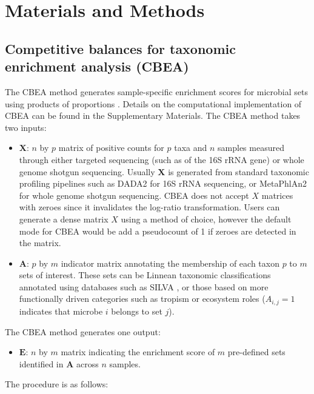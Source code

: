 \documentclass[10pt,letterpaper]{article}
\begin{document}
\section*{Materials and Methods} \label{methods}
\subsection*{Competitive balances for taxonomic enrichment analysis (CBEA)}
The CBEA method generates sample-specific enrichment scores for microbial sets using products of proportions \cite{egozcue2003}. Details on the computational implementation of CBEA can be found in the Supplementary Materials. The CBEA method takes two inputs:  
\begin{itemize}
    \item $\mathbf{X}$: $n$ by $p$ matrix of positive counts for $p$ taxa and $n$ samples measured through either targeted sequencing (such as of the 16S rRNA gene) or whole genome shotgun sequencing. Usually $\mathbf{X}$ is generated from standard taxonomic profiling pipelines such as DADA2 \cite{callahan2016} for 16S rRNA sequencing, or MetaPhlAn2 \cite{truong2015} for whole genome shotgun sequencing. CBEA does not accept $X$ matrices with zeroes since it invalidates the log-ratio transformation. Users can generate a dense matrix $X$ using a method of choice, however the default mode for CBEA would be add a pseudocount of 1 if zeroes are detected in the matrix. 
    \item $\mathbf{A}$: $p$ by $m$ indicator matrix annotating the membership of each taxon $p$ to $m$ sets of interest. These sets can be Linnean taxonomic classifications annotated using databases such as SILVA \cite{quast2013}, or those based on more functionally driven categories such as tropism or ecosystem roles ($A_{i,j} = 1$ indicates that microbe $i$ belongs to set $j$). 
\end{itemize}
The CBEA method generates one output:  
\begin{itemize} 
    \item $\mathbf{E}$: $n$ by $m$ matrix indicating the enrichment score of $m$ pre-defined sets identified in $\mathbf{A}$ across $n$ samples. 
\end{itemize}
The procedure is as follows:  
\end{document}
